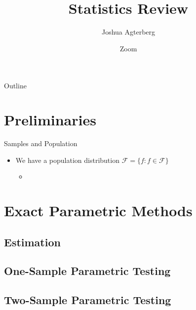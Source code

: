 \documentclass{beamer}
\title[Statistics Review] %
{Statistics Review}
\author[Joshua Agterberg] %
{Joshua Agterberg}
\institute[My Inst.]{\small Johns Hopkins University}
\date[Short Occasion] %
{\small Zoom}
\begin{document}
\begin{frame}
  \titlepage
\end{frame}

\begin{frame}{Outline}
  \tableofcontents
\end{frame}



\section{Preliminaries}

\begin{frame}{Samples and Population}
\begin{itemize}
\item We have a population distribution $\mathcal{F} = \{ f: f \in \mathcal{F}\}$
\pause
\begin{itemize}
\item

\end{itemize}
\end{itemize}

\end{frame}


\section{Exact Parametric Methods}

\subsection{Estimation}

\subsection{One-Sample Parametric Testing}

\subsection{Two-Sample Parametric Testing}
 
\end{document}
